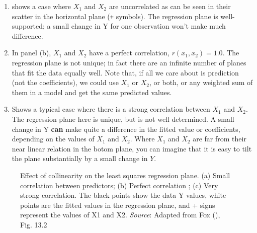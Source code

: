 \documentclass[
  letterpaper,
  10pt,
  krantz2]{krantz}
\begin{document}
{\begin{enumerate}
\def\labelenumi{(\alph{enumi})}
\item
  shows a case where \(X_1\) and \(X_2\) are uncorrelated as can be seen
  in their scatter in the horizontal plane (\texttt{+} symbols). The
  regression plane is well-supported; a small change in Y for one
  observation won't make much difference.
\item
  In panel (b), \(X_1\) and \(X_2\) have a perfect correlation,
  \(r (x_1, x_2) = 1.0\). The regression plane is not unique; in fact
  there are an infinite number of planes that fit the data equally well.
  Note that, if all we care about is prediction (not the coefficients),
  we could use \(X_1\) or \(X_2\), or both, or any weighted sum of them
  in a model and get the same predicted values.
\item
  Shows a typical case where there is a strong correlation between
  \(X_1\) and \(X_2\). The regression plane here is unique, but is not
  well determined. A small change in Y \textbf{can} make quite a
  difference in the fitted value or coefficients, depending on the
  values of \(X_1\) and \(X_2\). Where \(X_1\) and \(X_2\) are far from
  their near linear relation in the botom plane, you can imagine that it
  is easy to tilt the plane substantially by a small change in \(Y\).
\end{enumerate}

\begin{figure}


\caption{\label{fig-collin-demo}Effect of collinearity on the least
squares regression plane. (a) Small correlation between predictors; (b)
Perfect correlation ; (c) Very strong correlation. The black points show
the data Y values, white points are the fitted values in the regression
plane, and + signs represent the values of X1 and X2. \emph{Source}:
Adapted from Fox (), Fig. 13.2}


\end{figure}}
\end{document}
